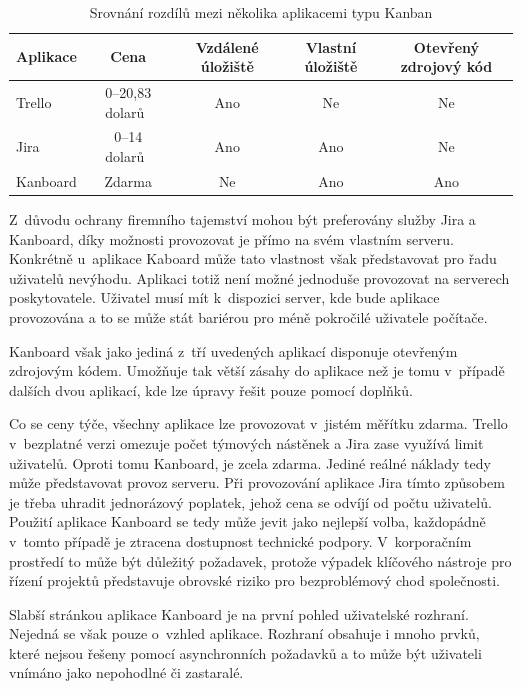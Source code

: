 \begin{table}[H]
\centering
\caption{Srovnání rozdílů mezi několika aplikacemi typu Kanban}
\label{tab:kanban-sum}
\begin{tabular}{ |l|c|c|c|c| } 
\hline
Aplikace & Cena\footnotemark & Vzdálené úložiště & Vlastní úložiště & Otevřený zdrojový kód  \\
\hline
Trello & 0--20,83 dolarů~\cite{bib:trello-pricing} & Ano & Ne & Ne \\ 
Jira & 0--14 dolarů~\cite{bib:jira-pricing} & Ano & Ano & Ne \\ 
Kanboard & Zdarma & Ne & Ano & Ano \\ 
\hline
\end{tabular}
\end{table}

Z~důvodu ochrany firemního tajemství mohou být preferovány služby Jira a Kanboard, díky možnosti provozovat je přímo na svém vlastním serveru. Konkrétně u~aplikace Kaboard může tato vlastnost však představovat pro řadu uživatelů nevýhodu. Aplikaci totiž není možné jednoduše provozovat na serverech poskytovatele. Uživatel musí mít k~dispozici server, kde bude aplikace provozována a to se může stát bariérou pro méně pokročilé uživatele počítače.

Kanboard však jako jediná z~tří uvedených aplikací disponuje otevřeným zdrojovým kódem. Umožňuje tak větší zásahy do aplikace než je tomu v~případě dalších dvou aplikací, kde lze úpravy řešit pouze pomocí doplňků.

Co se ceny týče, všechny aplikace lze provozovat v~jistém měřítku zdarma. Trello v~bezplatné verzi omezuje počet týmových nástěnek a Jira zase využívá limit uživatelů. Oproti tomu Kanboard, je zcela zdarma. Jediné reálné náklady tedy může představovat provoz serveru. Při provozování aplikace Jira tímto způsobem je třeba uhradit jednorázový poplatek, jehož cena se odvíjí od počtu uživatelů. Použití aplikace Kanboard se tedy může jevit jako nejlepší volba, každopádně v~tomto případě je ztracena dostupnost technické podpory. V~korporačním prostředí to může být důležitý požadavek, protože výpadek klíčového nástroje pro řízení projektů představuje obrovské riziko pro bezproblémový chod společnosti.

Slabší stránkou aplikace Kanboard je na první pohled uživatelské rozhraní. Nejedná se však pouze o~vzhled aplikace. Rozhraní obsahuje i mnoho prvků, které nejsou řešeny pomocí asynchronních požadavků a to může být uživateli vnímáno jako nepohodlné či zastaralé.

